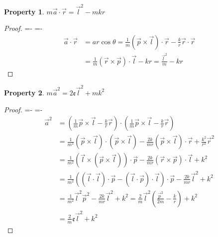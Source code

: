 \documentclass[12pt,a4paper]{report}
\newtheorem{property}{Property}[section]
\theoremstyle{definition}
\theoremstyle{remark}
\theoremstyle{remark}
\begin{document}
\begin{property}\label{pclrl4}
$m\vec{a}\cdot\vec{r}=\vec{l}^2-mkr$
\end{property}
\begin{proof}
\abovedisplayskip=-\baselineskip
\belowdisplayskip=0pt
\abovedisplayshortskip=-\baselineskip
\belowdisplayshortskip=0pt
\begin{align*}
\vec{a}\cdot\vec{r} &= ar\cos\theta=\frac{1}{m}(\vec{p}\times\vec{l})\cdot\vec{r}-\frac{k}{r}\vec{r}\cdot\vec{r} \\
&= \frac{1}{m}(\vec{r}\times\vec{p})\cdot\vec{l}-kr=\frac{\vec{l}^2}{m}-kr
\end{align*}
\end{proof}

\begin{property}\label{pclrl3}
$m\vec{a}^2=2\mathfrak{e}\vec{l}^2+mk^2$
\end{property}
\begin{proof}
\abovedisplayskip=-\baselineskip
\belowdisplayskip=0pt
\abovedisplayshortskip=-\baselineskip
\belowdisplayshortskip=0pt
\begin{align*}
\vec{a}^2 &= \left(\frac{1}{m}\vec{p}\times\vec{l}-\frac{k}{r}\vec{r}\right)\cdot\left(\frac{1}{m}\vec{p}\times\vec{l}-\frac{k}{r}\vec{r}\right) \\
&= \frac{1}{m^2}(\vec{p}\times\vec{l})\cdot(\vec{p}\times\vec{l})-\frac{2k}{mr}(\vec{p}\times\vec{l})\cdot\vec{r}+\frac{k^2}{r^2}\vec{r}^2 \\
&= \frac{1}{m^2}(\vec{l}\times(\vec{p}\times\vec{l}))\cdot\vec{p}-\frac{2k}{mr}(\vec{r}\times\vec{p})\cdot\vec{l}+k^2 \\
&= \frac{1}{m^2}\left((\vec{l}\cdot\vec{l})\cdot\vec{p}-(\vec{l}\cdot\vec{p})\cdot\vec{l}\right)\cdot\vec{p}-\frac{2k}{mr}\vec{l}^2+k^2 \\
&= \frac{1}{m^2}\vec{l}^2\vec{p}^2-\frac{2k}{mr}\vec{l}^2+k^2 = \frac{2}{m}\vec{l}^2\left(\frac{\vec{p}^2}{2m}-\frac{k}{r}\right)+k^2 \\
&= \frac{2}{m}\mathfrak{e}\vec{l}^2+k^2
\end{align*}
\end{proof}
\end{document}
